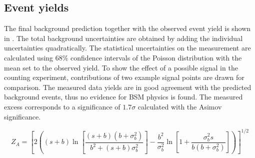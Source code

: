 \subsection{Event yields}
The final background prediction together with the observed event yield is shown in .
The total background uncertainties are obtained by adding the individual uncertainties quadratically. The statistical uncertainties on the measurement are calculated using $68\%$ confidence intervals of the Poisson distribution with the mean set to the observed yield.
To show the effect of a possible signal in the counting experiment, contributions of two example signal points are drawn for comparison. The measured data yields are in good agreement with the predicted background events, thus no evidence for BSM physics is found. The measured excess corresponds to a significance of $1.7\sigma$ calculated with the Asimov significance.

\begin{equation}
 Z_A = \left[ 2\left( (s+b)\ln{\left[\frac{(s+b)(b+\sigma_{b}^2)}{b^2+(s+b)\sigma_{b}^2}\right]} -\frac{b^2}{\sigma_{b}^2} \ln \left[1+\frac{\sigma_b ^2 s}{b(b+\sigma_b ^2)} \right]  \right)    \right]^{1/2}
\end{equation}

